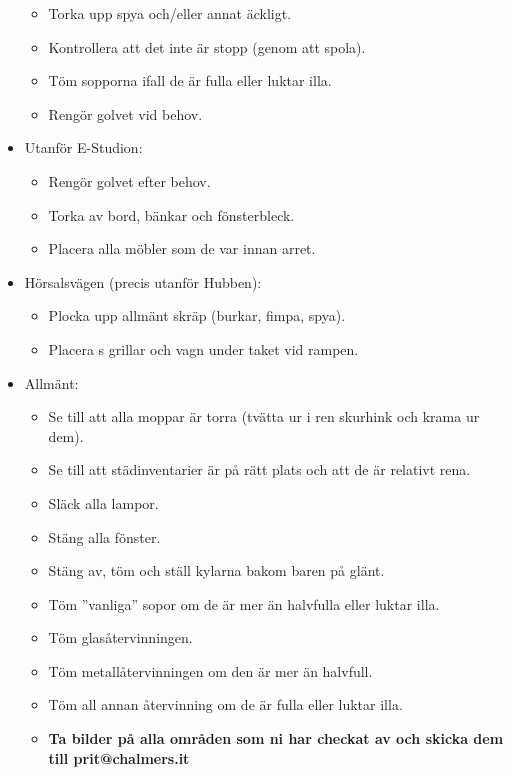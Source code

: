 \begin{itemize}
   \begin{itemize}
     \item Torka upp spya och/eller annat äckligt.
     \item Kontrollera att det inte är stopp (genom att spola).
     \item Töm sopporna ifall de är fulla eller luktar illa.
     \item Rengör golvet vid behov. 
   \end{itemize}
   \item Utanför E-Studion:
   \begin{itemize}
     \item Rengör golvet efter behov.
     \item Torka av bord, bänkar och fönsterbleck.
     \item Placera alla möbler som de var innan arret.
   \end{itemize}
   \newpage
   \item Hörsalsvägen (precis utanför Hubben):
   \begin{itemize}
     \item Plocka upp allmänt skräp (burkar, fimpa, spya).
     \item Placera \prit{}s grillar och vagn under taket vid rampen.
   \end{itemize}
   \item Allmänt:
   \begin{itemize}
     \item Se till att alla moppar är torra (tvätta ur i ren skurhink och krama ur dem).
     \item Se till att städinventarier är på rätt plats och att de är relativt rena.
     \item Släck alla lampor.
     \item Stäng alla fönster.
     \item Stäng av, töm och ställ kylarna bakom baren på glänt.
     \item Töm ''vanliga'' sopor om de är mer än halvfulla eller luktar illa.
     \item Töm glasåtervinningen.
     \item Töm metallåtervinningen om den är mer än halvfull.
     \item Töm all annan återvinning om de är fulla eller luktar illa.
     \item \textbf{Ta bilder på alla områden som ni har checkat av och skicka dem till prit@chalmers.it}
   \end{itemize}
 \end{itemize}